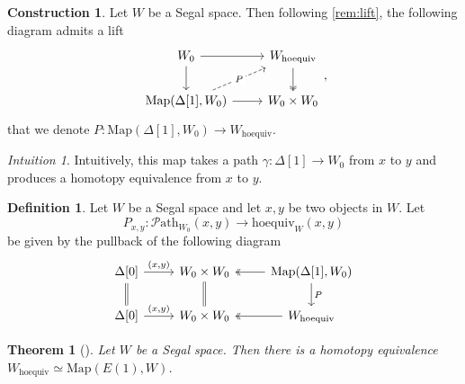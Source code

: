 \documentclass[11pt, a4paper]{amsart}
\newcommand{\Map}{\mathrm{Map}}
\newcommand{\hoequiv}{\mathrm{hoequiv}}
\newcommand{\Path}{\mathscr{P}\mathrm{ath}}
\newtheorem{theorem}[equation]{Theorem}
\theoremstyle{definition}
\newtheorem{definition}[equation]{Definition}
\newtheorem{construction}[equation]{Construction}
\theoremstyle{remark}
\newtheorem{intuition}[equation]{Intuition}
\numberwithin{equation}{section}
\begin{document}
 \begin{construction} \label{const:hoequiv path}
   Let $W$ be a Segal space. Then following \cref{rem:lift}, the following diagram admits a lift
   \[
   \begin{tikzcd}
    W_0 \arrow[r] \arrow[d] & W_{\hoequiv} \arrow[d, twoheadrightarrow] \\ 
    {\Map(\Delta[1],W_0)} \arrow[r] \arrow[ur, dashed, "P" description] & W_0 \times W_0
   \end{tikzcd},
   \]
   that we denote $P\colon \Map(\Delta[1],W_0) \to W_{\hoequiv}$. 
  \end{construction}
 
\begin{intuition}
  Intuitively, this map takes a path $\gamma\colon\Delta[1] \to W_0$ from $x$ to $y$ and produces a homotopy equivalence from $x$ to $y$.
\end{intuition}

\begin{definition} \label{def:hoequiv path}
  Let $W$ be a Segal space and let $x,y$ be two objects in $W$. Let 
  \[P_{x,y}\colon \Path_{W_0}(x,y) \to \hoequiv_W(x,y)\]
  be given by the pullback of the following diagram
  \[
  \begin{tikzcd}
  \Delta[0] \arrow[r,"{(x,y)}"] \arrow[d, equal] & W_0 \times W_0 \arrow[d, equal] & \Map(\Delta[1],W_0) \arrow[l, twoheadrightarrow] \arrow[d, "P"]\\
  \Delta[0] \arrow[r,"{(x,y)}"] & W_0 \times W_0 & W_{\hoequiv} \arrow[l, twoheadrightarrow]
  \end{tikzcd}
  \]
\end{definition}

\begin{theorem}[{\cite[Theorem 6.2]{rezk2001css}}] \label{thm:hoequiv is Eone}
  Let $W$ be a Segal space. Then there is a homotopy equivalence $W_{\hoequiv} \simeq \Map(E(1),W)$.
\end{theorem}
\end{document}
